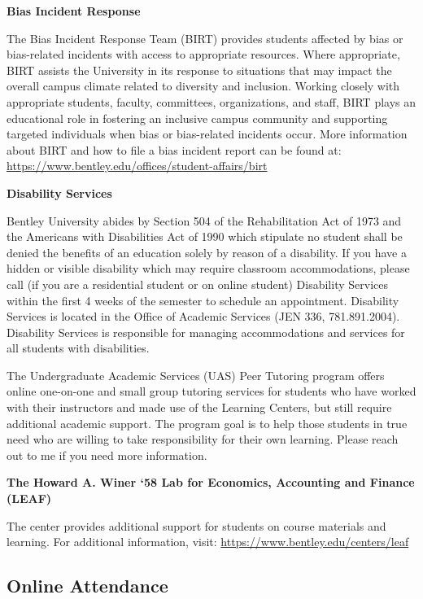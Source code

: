 \documentclass[
]{book}
\begin{document}
\textbf{Bias Incident Response}

The Bias Incident Response Team (BIRT) provides students affected by bias or bias-related incidents with access to appropriate resources. Where appropriate, BIRT assists the University in its response to situations that may impact the overall campus climate related to diversity and inclusion. Working closely with appropriate students, faculty, committees, organizations, and staff, BIRT plays an educational role in fostering an inclusive campus community and supporting targeted individuals when bias or bias-related incidents occur. More information about BIRT and how to file a bias incident report can be found at: \url{https://www.bentley.edu/offices/student-affairs/birt}

\textbf{Disability Services}

Bentley University abides by Section 504 of the Rehabilitation Act of 1973 and the Americans with Disabilities Act of 1990 which stipulate no student shall be denied the benefits of an education solely by reason of a disability. If you have a hidden or visible disability which may require classroom accommodations, please call (if you are a residential student or on online student) Disability Services within the first 4 weeks of the semester to schedule an appointment. Disability Services is located in the Office of Academic Services (JEN 336, 781.891.2004). Disability Services is responsible for managing accommodations and services for all students with disabilities.

The Undergraduate Academic Services (UAS) Peer Tutoring program offers online one-on-one and small group tutoring services for students who have worked with their instructors and made use of the Learning Centers, but still require additional academic support. The program goal is to help those students in true need who are willing to take responsibility for their own learning. Please reach out to me if you need more information.

\textbf{The Howard A. Winer `58 Lab for Economics, Accounting and Finance (LEAF)}

The center provides additional support for students on course materials and learning. For additional information, visit:
\url{https://www.bentley.edu/centers/leaf}

\hypertarget{online-attendance}{%
\subsection*{Online Attendance}\label{online-attendance}}
\end{document}
